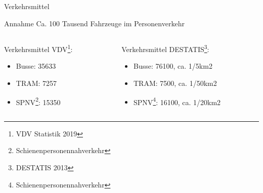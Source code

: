 
\begin{frame}{Verkehrsmittel}

  \begin{block}{Annahme}
    Ca. 100 Tausend Fahrzeuge im Personenverkehr
  \end{block}

  \begin{columns}

    \begin{column}{0.5\textwidth}
      \minipage[c][0.65\textheight][s]{\columnwidth}
      Verkehrsmittel VDV\footnote{VDV Statistik 2019}:
      \begin{itemize}
      \item Busse: 35633
      \item TRAM: 7257
      \item SPNV\footnote{Schienenpersonennahverkehr}: 15350
      \end{itemize}
      \endminipage
    
    \end{column}

    \begin{column}{0.5\textwidth}
      \minipage[c][0.65\textheight][s]{\columnwidth}
    Verkehrsmittel DESTATIS\footnote{DESTATIS 2013}:
    \begin{itemize}
    \item Busse: 76100, ca. 1/5km2
    \item TRAM: 7500, ca. 1/50km2
    \item SPNV\footnote{Schienenpersonennahverkehr}: 16100, ca. 1/20km2
    \end{itemize}
    \endminipage
    \end{column}

  \end{columns}

\end{frame}

